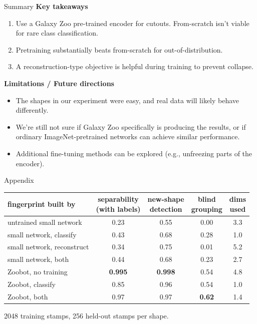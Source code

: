 \documentclass[aspectratio=169,11pt]{beamer}
\begin{document}
\begin{frame}{Summary}
  \textbf{Key takeaways}
  \begin{enumerate}
    \item Use a Galaxy Zoo pre-trained encoder for cutouts. From-scratch isn't viable for rare class classification. 
    \item Pretraining substantially beats from-scratch for out-of-distribution. 
    \item A reconstruction-type objective is helpful during training to prevent  collapse.
  \end{enumerate}
  \textbf{Limitations / Future directions}
  \begin{itemize}
    \item The shapes in our experiment were easy, and real data will likely behave differently.
    \item We're still not sure if Galaxy Zoo specifically is producing the results, or if ordinary 
    ImageNet-pretrained networks can achieve similar performance. 
    \item Additional fine-tuning methods can be explored (e.g., unfreezing parts of the encoder). 
  \end{itemize}
\end{frame}

\appendix

\begin{frame}{Appendix}
  \centering
  \footnotesize
  \begin{tabular}{@{}lcccc@{}}
    \toprule
    fingerprint built by
      & \shortstack{separability\\(with labels)}
      & \shortstack{new-shape\\detection}
      & \shortstack{blind\\grouping}
      & \shortstack{dims\\used} \\
    \midrule
    untrained small network     & 0.23 & 0.55 & 0.00 & 3.3 \\
    small network, classify     & 0.43 & 0.68 & 0.28 & 1.0 \\
    small network, reconstruct  & 0.34 & 0.75 & 0.01 & 5.2 \\
    small network, both         & 0.44 & 0.68 & 0.23 & 2.7 \\
    Zoobot, no training         & \textbf{0.995} & \textbf{0.998} & 0.54 & 4.8 \\
    Zoobot, classify            & 0.85 & 0.96 & 0.54 & 1.0 \\
    Zoobot, both                & 0.97 & 0.97 & \textbf{0.62} & 1.4 \\
    \bottomrule
  \end{tabular}
  \vspace{0.5em}

  2048 training stamps, 256 held-out stamps per shape.
\end{frame}
\end{document}

